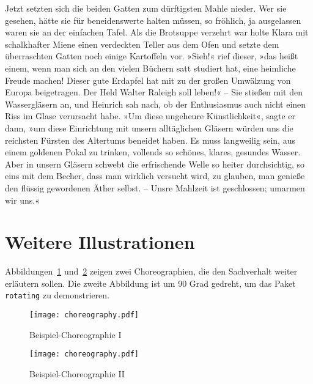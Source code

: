 Jetzt setzten sich die beiden Gatten zum dürftigsten Mahle nieder. Wer sie gesehen, hätte sie für beneidenswerte halten müssen, so fröhlich, ja ausgelassen waren sie an der einfachen Tafel. Als die Brotsuppe verzehrt war holte Klara mit schalkhafter Miene einen verdeckten Teller aus dem Ofen und setzte dem überraschten Gatten noch einige Kartoffeln vor. »Sieh!« rief dieser, »das heißt einem, wenn man sich an den vielen Büchern satt studiert hat, eine heimliche Freude machen! Dieser gute Erdapfel hat mit zu der großen Umwälzung von Europa beigetragen. Der Held Walter Raleigh soll leben!« – Sie stießen mit den Wassergläsern an, und Heinrich sah nach, ob der Enthusiasmus auch nicht einen Riss im Glase verursacht habe. »Um diese ungeheure Künstlichkeit«, sagte er dann, »um diese Einrichtung mit unsern alltäglichen Gläsern würden uns die reichsten Fürsten des Altertums beneidet haben. Es muss langweilig sein, aus einem goldenen Pokal zu trinken, vollends so schönes, klares, gesundes Wasser. Aber in unsern Gläsern schwebt die erfrischende Welle so heiter durchsichtig, so eins mit dem Becher, dass man wirklich versucht wird, zu glauben, man genieße den flüssig gewordenen Äther selbst. – Unsre Mahlzeit ist geschlossen; umarmen wir uns.«

\section{Weitere Illustrationen}
Abbildungen~\ref{fig:AnhangsChor} und~\ref{fig:AnhangsChor2} zeigen zwei Choreographien, die den
Sachverhalt weiter erläutern sollen. Die zweite Abbildung ist um 90 Grad gedreht, um das Paket
\texttt{rotating} zu demonstrieren.

\begin{figure}
  \begin{center}
    \texttt{[image: choreography.pdf]}
    \caption{Beispiel-Choreographie I}
    \label{fig:AnhangsChor}
  \end{center}
\end{figure}

\begin{landscape}
\begin{figure}
  \begin{center}
    \texttt{[image: choreography.pdf]}
    \caption{Beispiel-Choreographie II}
    \label{fig:AnhangsChor2}
  \end{center}
\end{figure}
\end{landscape}
